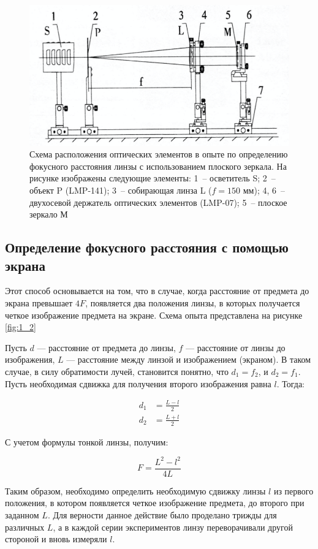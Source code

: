 \documentclass[a4paper, 12pt]{article}
\begin{document}
\begin{figure}[H]
	\centering
	\includegraphics[width=0.8\linewidth]{scheme_1}
	\caption{Схема расположения оптических элементов в опыте по определению фокусного расстояния линзы с использованием плоского зеркала. На рисунке изображены следующие элементы: 1~-- осветитель S; 2~-- объект P (LMP-141); 3~-- собирающая линза L ($f=150$ мм); 4, 6~-- двухосевой держатель оптических элементов (LMP-07); 5~-- плоское зеркало М}
	\label{fig:1_1}
\end{figure}

\subsection{Определение фокусного расстояния с помощью экрана}

Этот способ основывается на том, что в случае, когда расстояние от предмета до экрана превышает $4F$, появляется два положения линзы, в которых получается четкое изображение предмета на экране. Схема опыта представлена на рисунке \ref{fig:1_2}

Пусть $d$ --- расстояние от предмета до линзы, $f$ --- расстояние от линзы до изображения, $L$ --- расстояние между линзой и изображением (экраном). В таком случае, в силу обратимости лучей, становится понятно, что $d_1 = f_2$, и $d_2 = f_1$. Пусть необходимая сдвижка для получения второго изображения равна $l$. Тогда:

\begin{align*}
	d_1 &= \frac{L - l}{2} \\
	d_2 &= \frac{L + l}{2}
\end{align*}

С учетом формулы тонкой линзы, получим:

\begin{equation}
	F = \frac{L^2 - l^2}{4L}
\end{equation}

Таким образом, необходимо определить необходимую сдвижку линзы $l$ из первого положения, в котором появляется четкое изображение предмета, до второго при заданном $L$. Для верности данное действие было проделано трижды для различных $L$, а в каждой серии экспериментов линзу переворачивали другой стороной и вновь измеряли $l$.
\end{document}
